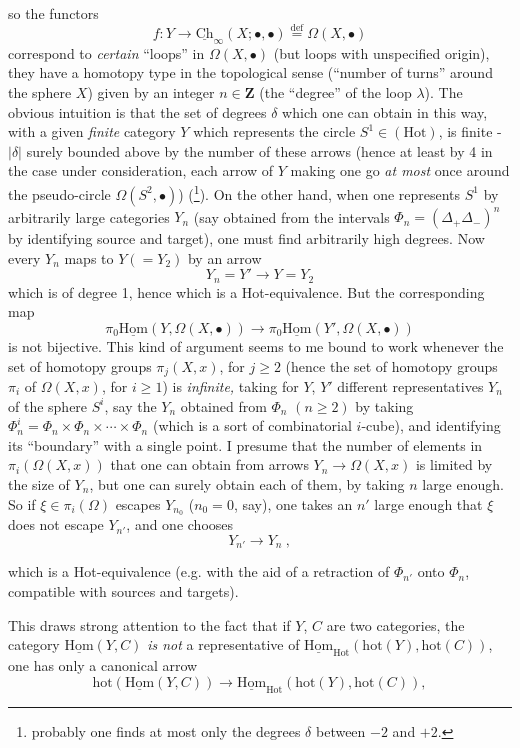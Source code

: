 \documentclass[11pt]{article}
\newcommand{\printedpage}[1]{\marginpar{\footnotesize p.~#1}}
\newcommand{\msp}[1]{\marginpar{\footnotesize [#1]}}
\newcommand{\Ch}{\underline{\mathrm{Ch}}}
\newcommand{\uHom}{\underline{\mathrm{Hom}}}
\newcommand{\Hot}{\mathrm{Hot}}
\begin{document}
\clearpage
\printedpage{83}

\msp{page 133}
so the functors
\[ f : Y\longrightarrow \Ch_\infty(X;\bullet,\bullet) \overset{\text{def}}{=} \Omega(X,\bullet) \]
correspond to \textit{certain} ``loops'' in $\Omega(X,\bullet)$ (but loops with unspecified origin), they have a homotopy type in the topological sense (``number of turns'' around the sphere $X$) given by an integer $n\in\mathbf{Z}$ (the ``degree'' of the loop $\lambda$). The obvious intuition is that the set of degrees $\delta$ which one can obtain in this way, with a given \textit{finite} category $Y$ which represents the circle $S^1\in(\Hot)$, is finite - $|\delta|$ surely bounded above by the number of these arrows (hence at least by 4 in the case under consideration, each arrow of $Y$ making one go \textit{at most} once around the pseudo-circle $\Omega(S^2,\bullet)$) (\footnote[28]{probably one finds at most only the degrees $\delta$ between $-2$ and $+2$.}). On the other hand, when one represents $S^1$ by arbitrarily large categories $Y_n$ (say obtained from the intervals $\Phi_n=(\Delta_+\Delta_-)^n$ by identifying source and target), one must find arbitrarily high degrees. Now every $Y_n$ maps to $Y(=Y_2)$ by an arrow
\[ Y_n = Y' \longrightarrow Y = Y_2 \]
\msp{page 134}
which is of degree 1, hence which is a Hot-equivalence. But the corresponding map
\[ \pi_0\uHom(Y,\Omega(X,\bullet)) \longrightarrow \pi_0\uHom(Y',\Omega(X,\bullet)) \]
is not bijective. This kind of argument seems to me bound to work whenever the set of homotopy groups $\pi_j(X,x)$, for $j\geq 2$ (hence the set of homotopy groups $\pi_i$ of $\Omega(X,x)$, for $i\geq 1$) is \textit{infinite,} taking for $Y$, $Y'$ different representatives $Y_n$ of the sphere $S^i$, say the $Y_n$ obtained from $\Phi_n$ $(n\geq 2)$ by taking $\Phi_n^i = \Phi_n\times\Phi_n\times\cdots\times\Phi_n$ (which is a sort of combinatorial $i$-cube), and identifying its ``boundary'' with a single point. I presume that the number of elements in $\pi_i(\Omega(X,x))$ that one can obtain from arrows $Y_n\longrightarrow\Omega(X,x)$ is limited by the size of $Y_n$, but one can surely obtain each of them, by taking $n$ large enough. So if $\xi\in\pi_i(\Omega)$ escapes $Y_{n_0}$ ($n_0=0$, say), one takes an $n'$ large enough that $\xi$ does not escape $Y_{n'}$, and one chooses %
\[ Y_{n'} \longrightarrow Y_n\ , \]


\msp{page 135}
which is a Hot-equivalence (e.g. with the aid of a retraction of $\Phi_{n'}$ onto $\Phi_n$, compatible with sources and targets).

This draws strong attention to the fact that if $Y$, $C$ are two categories, the category $\uHom(Y,C)$ \textit{is not} a representative of $\uHom_{\Hot}(\mathrm{hot}(Y),\mathrm{hot}(C))$, one has only a canonical arrow
\[ \mathrm{hot}(\uHom(Y,C)) \longrightarrow \uHom_{\Hot}(\mathrm{hot}(Y),\mathrm{hot}(C)), \tag*{$(*)$} \]
\end{document}
